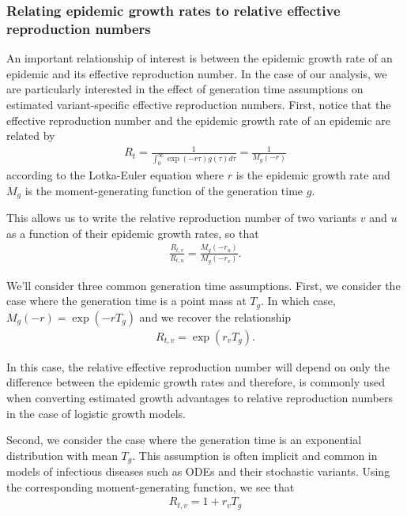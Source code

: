 \documentclass[11pt,oneside,letterpaper]{article}
\begin{document}
\newpage

\subsubsection*{Relating epidemic growth rates to relative effective reproduction numbers}

An important relationship of interest is between the epidemic growth rate of an epidemic and its effective reproduction number.
In the case of our analysis, we are particularly interested in the effect of generation time assumptions on estimated variant-specific effective reproduction numbers.
First, notice that the effective reproduction number and the epidemic growth rate of an epidemic are related by
\begin{align*}
R_{t} = \frac{1}{\int_{0}^{\infty} \exp(-r\tau)g(\tau)d\tau} = \frac{1}{M_{g}(-r)}
\end{align*}
according to the Lotka-Euler equation \cite{Wallinga2006} where $r$ is the epidemic growth rate and $M_{g}$ is the moment-generating function of the generation time $g$.

This allows us to write the relative reproduction number of two variants $v$ and $u$ as a function of their epidemic growth rates, so that
\begin{align*}
\frac{R_{t,v}}{R_{t,u}} = \frac{M_{g}(-r_{u})}{M_{g}(-r_{v})}.
\end{align*}

We'll consider three common generation time assumptions. First, we consider the case where the generation time is a point mass at $T_{g}$. In which case, $M_{g}(-r) = \exp(-r T_{g})$ and we recover the relationship
\begin{align*}
R_{t,v} = \exp(r_{v}T_{g}).
\end{align*}

In this case, the relative effective reproduction number will depend on only the difference between the epidemic growth rates and therefore, is commonly used when converting estimated growth advantages to relative reproduction numbers in the case of logistic growth models.

Second, we consider the case where the generation time is an exponential distribution with mean $T_{g}$. This assumption is often implicit and common in models of infectious diseases such as ODEs and their stochastic variants. Using the corresponding moment-generating function, we see that
\begin{align*}
R_{t,v} = 1 + r_{v} T_{g}
\end{align*}
\end{document}
